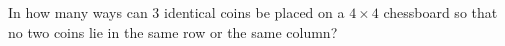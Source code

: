 In how many ways can $3$ identical coins be placed on a $4\times4$ chessboard so that no two coins lie in the same row or the same column?
